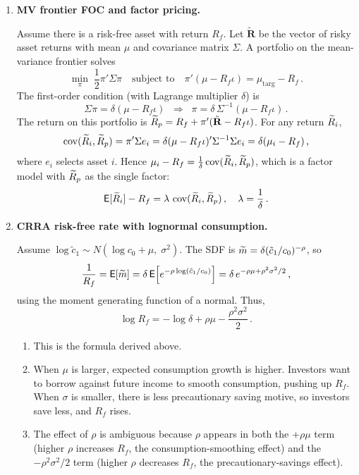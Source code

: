 \begin{enumerate}
\item \textbf{MV frontier FOC and factor pricing.}

Assume there is a risk-free asset with return $R_f$.  Let $\tilde{\mathbf{R}}$ be the vector of risky asset returns with mean $\mu$ and covariance matrix $\Sigma$.  A portfolio on the mean-variance frontier solves
\[
\min_\pi \;\frac{1}{2}\pi'\Sigma\pi \quad\text{subject to}\quad \pi'(\mu - R_f\iota) = \mu_{\mathrm{targ}} - R_f\,.
\]
The first-order condition (with Lagrange multiplier $\delta$) is
\[
\Sigma \pi = \delta(\mu - R_f\iota) \;\;\Longrightarrow\;\; \pi = \delta\,\Sigma^{-1}(\mu - R_f\iota)\,.
\]
The return on this portfolio is $\widetilde{R}_p = R_f + \pi'(\tilde{\mathbf{R}}-R_f\iota)$.  For any return $\widetilde{R}_i$,
\[
\operatorname{cov}(\widetilde{R}_i,\widetilde{R}_p) = \pi'\Sigma e_i = \delta(\mu-R_f\iota)'\Sigma^{-1}\Sigma e_i = \delta(\mu_i - R_f)\,,
\]
where $e_i$ selects asset $i$. Hence $\mu_i - R_f = \frac{1}{\delta}\operatorname{cov}(\widetilde{R}_i,\widetilde{R}_p)$, which is a factor model with $\widetilde{R}_p$ as the single factor:
\[
\mathsf{E}[\widetilde{R}_i] - R_f = \lambda\,\operatorname{cov}(\widetilde{R}_i,\widetilde{R}_p)\,,\quad \lambda = \frac{1}{\delta}\,.
\]

\item \textbf{CRRA risk-free rate with lognormal consumption.}

Assume $\log \tilde{c}_1 \sim N(\log c_0 + \mu,\;\sigma^2)$.  The SDF is $\widetilde{m} = \delta(\tilde{c}_1/c_0)^{-\rho}$, so
\[
\frac{1}{R_f} = \mathsf{E}[\widetilde{m}] = \delta\,\mathsf{E}\!\left[e^{-\rho\log(\tilde{c}_1/c_0)}\right] = \delta\,e^{-\rho\mu + \rho^2\sigma^2/2}\,,
\]
using the moment generating function of a normal.  Thus,
\[
\log R_f = -\log\delta + \rho\mu - \frac{\rho^2\sigma^2}{2}\,.
\]

\begin{enumerate}
\item[(a)] This is the formula derived above.

\item[(b)] When $\mu$ is larger, expected consumption growth is higher.  Investors want to borrow against future income to smooth consumption, pushing up $R_f$.  When $\sigma$ is smaller, there is less precautionary saving motive, so investors save less, and $R_f$ rises.

\item[(c)] The effect of $\rho$ is ambiguous because $\rho$ appears in both the $+\rho\mu$ term (higher $\rho$ increases $R_f$, the consumption-smoothing effect) and the $-\rho^2\sigma^2/2$ term (higher $\rho$ decreases $R_f$, the precautionary-savings effect).
\end{enumerate}


\end{enumerate}
